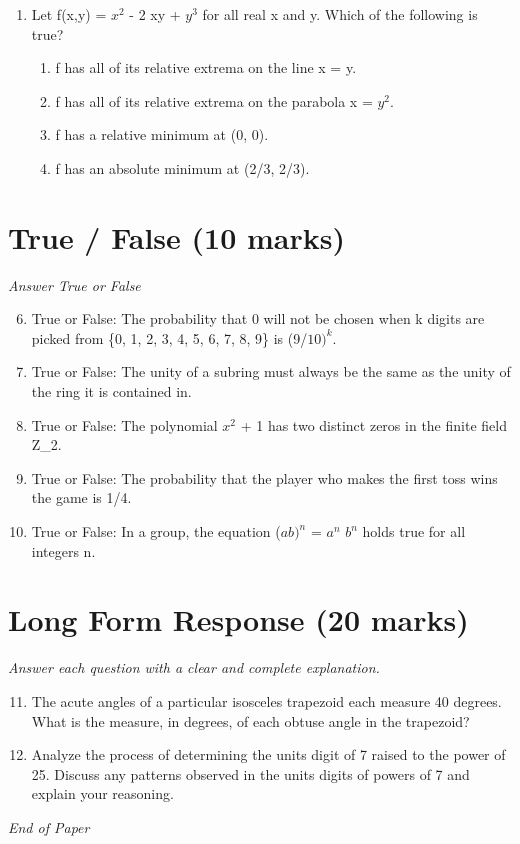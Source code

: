 \documentclass[12pt]{article}
\begin{document}
\begin{enumerate}[label=\arabic*.]
\begin{enumerate}[label=(\alph*)]
    \item -1
\end{enumerate}
\item Let f(x,y) = $x^2$ - 2 xy + $y^3$ for all real x and y. Which of the following is true?
\begin{enumerate}[label=(\alph*)]
    \item f has all of its relative extrema on the line x = y.
    \item f has all of its relative extrema on the parabola x = $y^2$.
    \item f has a relative minimum at (0, 0).
    \item f has an absolute minimum at (2/3, 2/3).
\end{enumerate}
\end{enumerate}

\section*{True / False (10 marks)}
\textit{Answer True or False}
\begin{enumerate}[label=\arabic*.]
\setcounter{enumi}{5}
\item True or False: The probability that 0 will not be chosen when k digits are picked from \{0, 1, 2, 3, 4, 5, 6, 7, 8, 9\} is (9/$10)^k$.
\item True or False: The unity of a subring must always be the same as the unity of the ring it is contained in.
\item True or False: The polynomial $x^2$ + 1 has two distinct zeros in the finite field Z\_2.
\item True or False: The probability that the player who makes the first toss wins the game is 1/4.
\item True or False: In a group, the equation ($ab)^n$ = $a^n$ $b^n$ holds true for all integers n.
\end{enumerate}

\section*{Long Form Response (20 marks)}
\textit{Answer each question with a clear and complete explanation.}
\begin{enumerate}[label=\arabic*.]
\setcounter{enumi}{10}
\item The acute angles of a particular isosceles trapezoid each measure 40 degrees. What is the measure, in degrees, of each obtuse angle in the trapezoid?
\item Analyze the process of determining the units digit of 7 raised to the power of 25. Discuss any patterns observed in the units digits of powers of 7 and explain your reasoning.
\end{enumerate}

\vfill
\noindent\textit{End of Paper}
\end{document}
